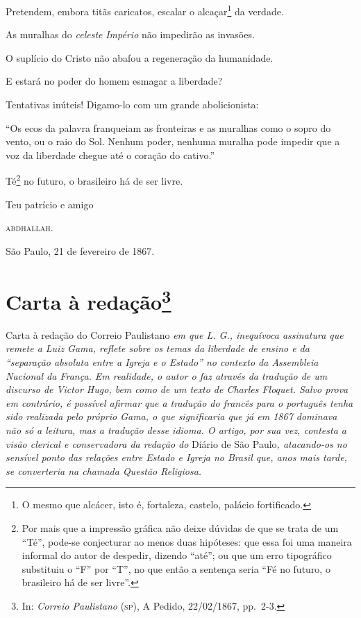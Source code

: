 Pretendem, embora titãs caricatos, escalar o alcaçar\footnote{O mesmo
  que alcácer, isto é, fortaleza, castelo, palácio fortificado.} da
verdade.

As muralhas do \emph{celeste} \emph{Império} não impedirão as invasões.

O suplício do Cristo não abafou a regeneração da humanidade.

E estará no poder do homem esmagar a liberdade?

Tentativas inúteis! Digamo-lo com um grande abolicionista:

``Os ecos da palavra franqueiam as fronteiras e as muralhas como o sopro
do vento, ou o raio do Sol. Nenhum poder, nenhuma muralha pode impedir
que a voz da liberdade chegue até o coração do cativo.''

Té\footnote{Por mais que a impressão gráfica não deixe dúvidas de que
  se trata de um ``Té'', pode-se conjecturar ao menos duas hipóteses: que
  essa foi uma maneira informal do autor de despedir, dizendo ``até''; ou
  que um erro tipográfico substituiu o ``F'' por ``T'', no que então a
  sentença seria ``Fé no futuro, o brasileiro há de ser livre''.} no
futuro, o brasileiro há de ser livre.
\begin{flushright}
Teu patrício e amigo

\textsc{abdhallah}.

São Paulo, 21 de fevereiro de 1867.
\end{flushright}
\chapter{Carta à redação\footnote{In: \emph{Correio Paulistano} (\textsc{sp}),
  A Pedido, 22/02/1867, pp.~2-3.}}

\begin{didascalia}
Carta à redação do Correio Paulistano \emph{em que L. G., inequívoca
assinatura que remete a Luiz Gama, reflete sobre os temas da liberdade
de ensino e da ``separação absoluta entre a Igreja e o Estado'' no
contexto da Assembleia Nacional da França. Em realidade, o autor o faz
através da tradução de um discurso de Victor Hugo, bem como de um texto
de Charles Floquet. Salvo prova em contrário, é possível afirmar que a
tradução do francês para o português tenha sido realizada pelo próprio
Gama, o que significaria que já em 1867 dominava não só a leitura, mas a
tradução desse idioma. O artigo, por sua vez, contesta a visão clerical
e conservadora da redação do} Diário de São Paulo\emph{, atacando-os no
sensível ponto das relações entre Estado e Igreja no Brasil que, anos
mais tarde, se converteria na chamada Questão Religiosa.}
\end{didascalia}



